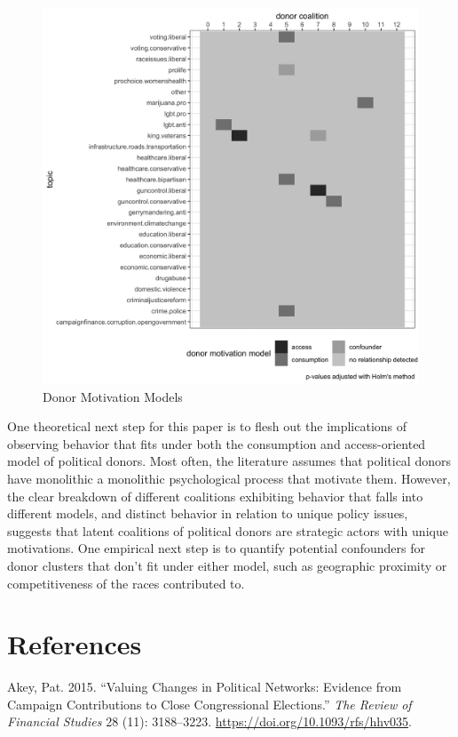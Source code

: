\documentclass[12pt,]{article}
\begin{document}
\begin{figure}
\centering
\includegraphics{../tables_and_figures/aejmc_abstract_1.jpg}
\caption{Donor Motivation Models}
\end{figure}

One theoretical next step for this paper is to flesh out the
implications of observing behavior that fits under both the consumption
and access-oriented model of political donors. Most often, the
literature assumes that political donors have monolithic a monolithic
psychological process that motivate them. However, the clear breakdown
of different coalitions exhibiting behavior that falls into different
models, and distinct behavior in relation to unique policy issues,
suggests that latent coalitions of political donors are strategic actors
with unique motivations. One empirical next step is to quantify
potential confounders for donor clusters that don't fit under either
model, such as geographic proximity or competitiveness of the races
contributed to.

\hypertarget{references}{%
\section*{References}\label{references}}

\hypertarget{refs}{}
\leavevmode\hypertarget{ref-akey2015}{}%
Akey, Pat. 2015. ``Valuing Changes in Political Networks: Evidence from
Campaign Contributions to Close Congressional Elections.'' \emph{The
Review of Financial Studies} 28 (11): 3188--3223.
\url{https://doi.org/10.1093/rfs/hhv035}.
\end{document}
